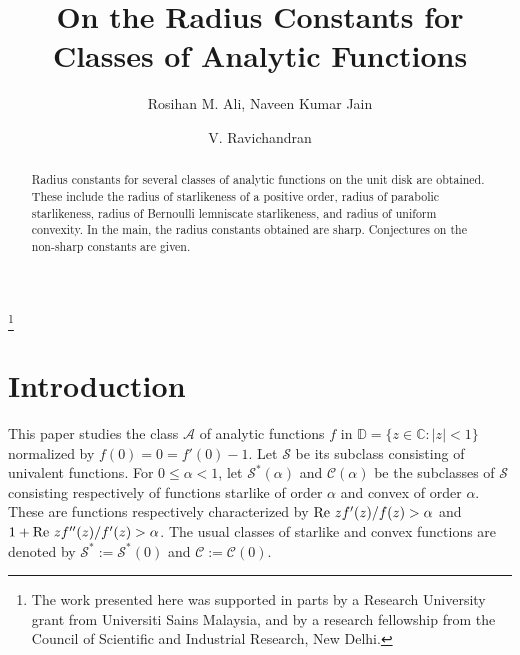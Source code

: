 \documentclass{amsart}
\begin{document}
\title[On the Radius Constants for Classes of Analytic Function] {On the Radius Constants for Classes of Analytic Functions}

\author[R. M. Ali, N. K. Jain \and V. Ravichandran]{\first Rosihan M. Ali, \second Naveen Kumar Jain \and \third V. Ravichandran}

\address{\first \andthird  School of Mathematical Sciences, Universiti Sains Malaysia, 11800 USM, Penang, Malaysia\\
 \second \andthird Department of Mathematics, University of Delhi, Delhi 110007, India\\}

\thanks{The work presented here was supported in parts by a Research University grant from Universiti Sains Malaysia, and by a research fellowship from
the Council of Scientific and Industrial Research, New Delhi.}

\begin{abstract}

Radius constants for several classes of analytic functions on the unit disk are obtained. These include the radius of starlikeness of a positive order, radius of parabolic starlikeness, radius of Bernoulli lemniscate starlikeness, and radius of uniform convexity. In the main, the radius constants obtained are sharp. Conjectures on the non-sharp constants are given.
\end{abstract}



\maketitle

\section{Introduction} This paper studies the class $\mathcal{A}$ of analytic functions $f$ in $\mathbb{D} =\{z\in\mathbb{C}: |z| <1\}$
normalized by $f(0)=0=f'(0)-1$. Let $\mathcal{S}$ be its subclass consisting of univalent functions. For $0\leq\alpha<1$, let $\mathcal{S^*}(\alpha)$  and $\mathcal{C}(\alpha) $ be the subclasses of $\mathcal{S}$ consisting respectively of functions starlike of order $\alpha$ and convex   of order $\alpha$. These are functions respectively characterized by $\text{\textrm{Re}}\ zf'(z)/ f(z)> \alpha$ and $1 + \text{\textrm{Re}} \
 zf''(z)/ f'(z)> \alpha$. The usual classes of starlike and convex functions are denoted by $\mathcal{S^*}:=\mathcal{S^*}(0)$  and $\mathcal{C}:=\mathcal{C}(0)$.
\end{document}
